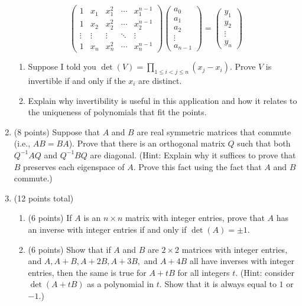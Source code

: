 \documentclass[12pt]{article}
\begin{document}
\begin{enumerate}
    $$\begin{pmatrix}
1 & x_1 & x_1^2 & \cdots & x_1^{n-1} \\
1 & x_2 & x_2^2 & \cdots & x_2^{n-1} \\
\vdots & \vdots & \vdots & \ddots & \vdots \\
1 & x_n & x_n^2 & \cdots & x_n^{n-1}
\end{pmatrix}
\begin{pmatrix}
a_0 \\
a_1 \\
a_2 \\
\vdots \\
a_{n-1}
\end{pmatrix}
=
\begin{pmatrix}
y_1 \\
y_2 \\
\vdots \\
y_n
\end{pmatrix}$$
    \begin{enumerate}
        \item 

Suppose I told you $\det(V) = \prod_{1 \leq i  < j \leq n} (x_j - x_i)$. Prove $V$ is invertible if and only if the $x_i$ are distinct.

\item Explain why invertibility is useful in this application and how it relates to the uniqueness of polynomials that fit the points.
    \end{enumerate}
    
    
    \item (8 points) Suppose that \( A \) and \( B \) are real symmetric matrices that commute (i.e., \( AB = BA \)). Prove that there is an orthogonal matrix \( Q \) such that both \( Q^{-1} A Q \) and \( Q^{-1} B Q \) are diagonal. (Hint: Explain why it suffices to prove that \( B \) preserves each eigenspace of \( A \). Prove this fact using the fact that \( A \) and \( B \) commute.)

     \item (12 points total) 
    \begin{enumerate}
        \item (6 points) If \( A \) is an \( n \times n \) matrix with integer entries, prove that \( A \) has an inverse with integer entries if and only if \( \det(A) = \pm 1 \).
        \item (6 points) Show that if \( A \) and \( B \) are \( 2 \times 2 \) matrices with integer entries, and \( A, A+B, A+2B, A+3B, \) and \( A+4B \) all have inverses with integer entries, then the same is true for \( A + tB \) for all integers \( t \). (Hint: consider \( \det(A + tB) \) as a polynomial in \( t \). Show that it is always equal to \( 1 \) or \( -1 \).)
    \end{enumerate}



\end{enumerate}
\end{document}

